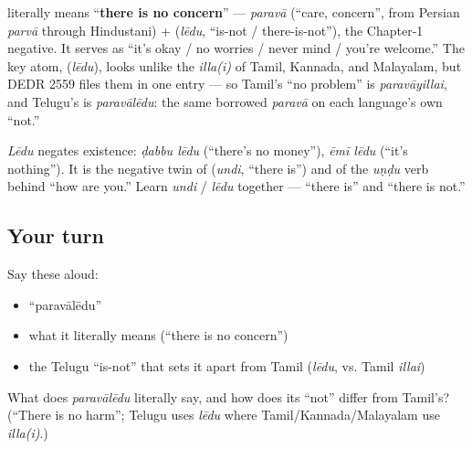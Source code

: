 \begin{cousinweb}
\textbf{} literally means \textquotedblleft{}\textbf{there is no concern}\textquotedblright{} — \emph{paravā} (\textquotedblleft{}care, concern\textquotedblright{}, from Persian \emph{parvā} through Hindustani) + \textbf{} (\emph{lēdu}, \textquotedblleft{}is-not / there-is-not\textquotedblright{}), the Chapter-1 negative. It serves as \textquotedblleft{}it's okay / no worries / never mind / you're welcome.\textquotedblright{} The key atom, \textbf{} (\emph{lēdu}), looks unlike the \emph{illa(i)} of Tamil, Kannada, and Malayalam, but DEDR 2559 files them in one entry — so Tamil's \textquotedblleft{}no problem\textquotedblright{} is \emph{paravāyillai}, and Telugu's is \emph{paravālēdu}: the same borrowed \emph{paravā} on each language's own \textquotedblleft{}not.\textquotedblright{}
\end{cousinweb}

\begin{grammarlens}[title={Grammar Lens: \te{లేదు}, Telugu's \textquotedblleft{}is-not\textquotedblright{}}]
\emph{Lēdu} negates existence: \emph{ḍabbu lēdu} (\textquotedblleft{}there's no money\textquotedblright{}), \emph{ēmī lēdu} (\textquotedblleft{}it's nothing\textquotedblright{}). It is the negative twin of \textbf{} (\emph{undi}, \textquotedblleft{}there is\textquotedblright{}) and of the \emph{uṇḍu} verb behind \textquotedblleft{}how are you.\textquotedblright{} Learn \emph{undi} / \emph{lēdu} together — \textquotedblleft{}there is\textquotedblright{} and \textquotedblleft{}there is not.\textquotedblright{}
\end{grammarlens}

\subsection*{Your turn}
Say these aloud:

\begin{itemize}
\raggedright
  \item \textquotedblleft{}paravālēdu\textquotedblright{}
  \item what it literally means (\textquotedblleft{}there is no concern\textquotedblright{})
  \item the Telugu \textquotedblleft{}is-not\textquotedblright{} that sets it apart from Tamil (\emph{lēdu}, vs. Tamil \emph{illai})
\end{itemize}

\begin{tcolorbox}[breakable,colback=teal!4,colframe=teal!35!black,title={Before you move on}]
What does \emph{paravālēdu} literally say, and how does its \textquotedblleft{}not\textquotedblright{} differ from Tamil's? (\textquotedblleft{}There is no harm\textquotedblright{}; Telugu uses \emph{lēdu} where Tamil/Kannada/Malayalam use \emph{illa(i)}.)
\end{tcolorbox}
